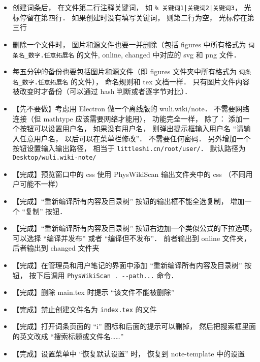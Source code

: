 \begin{itemize}
\item 创建词条后， 在文件第二行注释关键词， 如 \lstinline+% 关键词1|关键词2|关键词3+， 光标停留在第四行． 如果创建时没有填写关键词， 则第二行为空， 光标停在第三行

\item 删除一个文件时， 图片和源文件也要一并删除（包括 figures 中所有格式为 \verb|词条名_数字.任意拓展名| 的文件, online, changed 中对应的 svg 和 png 文件．

\item 每五分钟的备份也要包括图片和源文件（即 figures 文件夹中所有格式为 \verb|词条名_数字.任意拓展名| 的文件）， 命名规则和 tex 文档一样． 只有图片文件内容被改变时才备份（可以通过 hash 判断或者逐字节对比）．

\item 【先不要做】考虑用 Electron 做一个离线版的 wuli.wiki/note． 不需要网络连接（但 mathtype 应该需要网络才能用）， 功能完全一样， 除了： 添加一个按钮可以设置用户名， 如果没有用户名， 则弹出提示框输入用户名 “请输入任意用户名， 以后可以在菜单栏修改”． 不需要任何密码． 另外增加一个按钮设置输入输出路径， 相当于 \verb|littleshi.cn/root/user/|． 默认路径为 \verb|Desktop/wuli.wiki-note/|

\item 【完成】预览窗口中的 css 使用 PhysWikiScan 输出文件夹中的 css （不同用户可能不一样）

\item 【完成】“重新编译所有内容及目录树” 按钮的输出框不能全选复制， 增加一个 “复制” 按钮．

\item 【完成】“重新编译所有内容及目录树” 按钮右边加一个类似公式的下拉选项， 可以选择 “编译并发布” 或者 “编译但不发布”． 前者输出到 online 文件夹， 后者输出到 changed 文件夹

\item 【完成】在管理员和用户笔记的界面中添加 “重新编译所有内容及目录树” 按钮， 按下后调用 \lstinline|PhysWikiScan . --path...|  命令．

\item 【完成】删除 main.tex 时提示 “该文件不能被删除”

\item 【完成】禁止创建文件名为 \lstinline|index.tex| 的文件

\item 【完成】打开词条页面的 “i” 图标和后面的提示可以删掉， 然后把搜索框里面的英文改成 “搜索标题或文件名……”

\item 【完成】设置菜单中 “恢复默认设置” 时， 恢复到 note-template 中的设置


\end{itemize}
